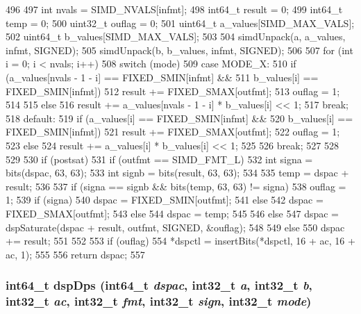 \begin{DoxyCode}
496 {
497     int nvals = SIMD_NVALS[infmt];
498     int64_t result = 0;
499     int64_t temp = 0;
500     uint32_t ouflag = 0;
501     uint64_t a_values[SIMD_MAX_VALS];
502     uint64_t b_values[SIMD_MAX_VALS];
503 
504     simdUnpack(a, a_values, infmt, SIGNED);
505     simdUnpack(b, b_values, infmt, SIGNED);
506 
507     for (int i = 0; i < nvals; i++) {
508         switch (mode) {
509           case MODE_X:
510             if (a_values[nvals - 1 - i] == FIXED_SMIN[infmt] &&
511                 b_values[i] == FIXED_SMIN[infmt]) {
512                 result += FIXED_SMAX[outfmt];
513                 ouflag = 1;
514             }
515             else
516                 result += a_values[nvals - 1 - i] * b_values[i] << 1;
517             break;
518           default:
519             if (a_values[i] == FIXED_SMIN[infmt] &&
520                 b_values[i] == FIXED_SMIN[infmt]) {
521                 result += FIXED_SMAX[outfmt];
522                 ouflag = 1;
523             } else {
524                 result += a_values[i] * b_values[i] << 1;
525             }
526             break;
527         }
528     }
529 
530     if (postsat) {
531         if (outfmt == SIMD_FMT_L) {
532             int signa = bits(dspac, 63, 63);
533             int signb = bits(result, 63, 63);
534 
535             temp = dspac + result;
536 
537             if (signa == signb && bits(temp, 63, 63) != signa) {
538                 ouflag = 1;
539                 if (signa)
540                     dspac = FIXED_SMIN[outfmt];
541                 else
542                     dspac = FIXED_SMAX[outfmt];
543             } else {
544                 dspac = temp;
545             }
546         } else {
547             dspac = dspSaturate(dspac + result, outfmt, SIGNED, &ouflag);
548         }
549     } else {
550         dspac += result;
551     }
552 
553     if (ouflag)
554         *dspctl = insertBits(*dspctl, 16 + ac, 16 + ac, 1);
555 
556     return dspac;
557 }
\end{DoxyCode}
\hypertarget{namespaceMipsISA_a1a929f7695ad8008ac3ccb032cdcdd6b}{
\subsubsection[{dspDps}]{\setlength{\rightskip}{0pt plus 5cm}int64\_\-t dspDps (int64\_\-t {\em dspac}, \/  int32\_\-t {\em a}, \/  int32\_\-t {\em b}, \/  int32\_\-t {\em ac}, \/  int32\_\-t {\em fmt}, \/  int32\_\-t {\em sign}, \/  int32\_\-t {\em mode})}}
\label{namespaceMipsISA_a1a929f7695ad8008ac3ccb032cdcdd6b}



